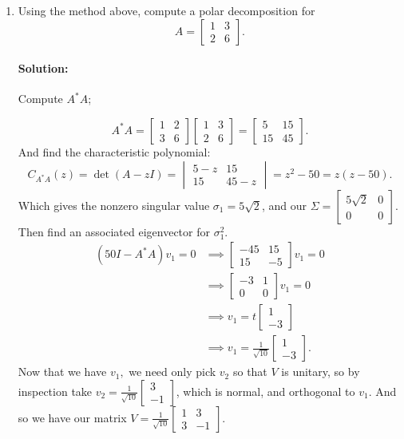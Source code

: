 \documentclass{article}
\begin{document}
\begin{enumerate}
\begin{enumerate}[label= (\alph*)]
\item Using the method above, compute a polar decomposition for
\[
    A=\begin{bmatrix} 1&3\\2&6 \end{bmatrix} 
.\] 
\paragraph{Solution: }Compute $A^* A$;

\[
    A^* A=\begin{bmatrix} 1&2\\3&6 \end{bmatrix} \begin{bmatrix} 1&3\\2&6 \end{bmatrix} 
    =\begin{bmatrix} 5&15\\15&45 \end{bmatrix} 
.\] 
And find the characteristic polynomial:
\[
    C_{A^* A}(z)=\det(A-zI)=\begin{vmatrix} 5-z&15\\15&45-z \end{vmatrix}= z^2-50=z(z-50)
.\] 
    Which gives the nonzero singular value $\sigma_1=5\sqrt{2} $, and our $\Sigma=\begin{bmatrix} 5\sqrt{2} &0\\0&0 \end{bmatrix} $. Then find an associated eigenvector for $\sigma_1^2$.
    \begin{align*}
        (50I-A^* A)v_1=0&\implies \begin{bmatrix} -45&15\\15&-5 \end{bmatrix}v_1=0 \\
                        &\implies \begin{bmatrix} -3&1\\0&0\end{bmatrix}v_1=0 \\
                        &\implies v_1=t\begin{bmatrix} 1\\-3 \end{bmatrix} \\
                        &\implies v_1=\frac{1}{\sqrt{10} }\begin{bmatrix} 1\\-3 \end{bmatrix} 
    .\end{align*}
    Now that we have $v_1,$ we need only pick $v_2$ so that $V$ is unitary, so by inspection take $v_2=\frac{1}{\sqrt{10} }\begin{bmatrix} 3\\-1 \end{bmatrix} $, which is normal, and orthogonal to $v_1$. And so we have our matrix $V=\frac{1}{\sqrt{10} }\begin{bmatrix} 1&3\\3&-1 \end{bmatrix} $.


\end{enumerate}
\end{enumerate}
\end{document}
